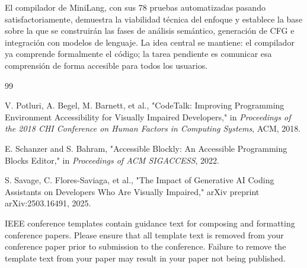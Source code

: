\documentclass[conference]{IEEEtran}
\begin{document}
El compilador de MiniLang, con sus 78 pruebas automatizadas pasando satisfactoriamente, demuestra la viabilidad técnica del enfoque y establece la base sobre la que se construirán las fases de análisis semántico, generación de CFG e integración con modelos de lenguaje. La idea central se mantiene: el compilador ya comprende formalmente el código; la tarea pendiente es comunicar esa comprensión de forma accesible para todos los usuarios.


\begin{thebibliography}{99}

V. Potluri, A. Begel, M. Barnett, et al.,
"CodeTalk: Improving Programming Environment Accessibility for Visually Impaired Developers,"
in \textit{Proceedings of the 2018 CHI Conference on Human Factors in Computing Systems}, ACM, 2018.

E. Schanzer and S. Bahram,
"Accessible Blockly: An Accessible Programming Blocks Editor,"
in \textit{Proceedings of ACM SIGACCESS}, 2022.

S. Savage, C. Flores-Saviaga, et al.,
"The Impact of Generative AI Coding Assistants on Developers Who Are Visually Impaired,"
arXiv preprint arXiv:2503.16491, 2025.

\end{thebibliography}


\vspace{12pt}
\color{red}
IEEE conference templates contain guidance text for composing and formatting conference papers. Please ensure that all template text is removed from your conference paper prior to submission to the conference. Failure to remove the template text from your paper may result in your paper not being published.
\end{document}
